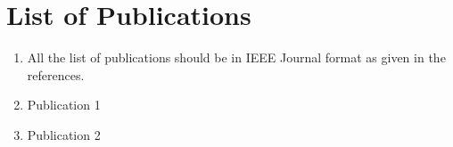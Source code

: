 \newpage
\normalsize{}

\chapter*{List of Publications}
\begin{enumerate}
	\item All the list of publications should be in IEEE Journal format as given in the references.
	\item Publication 1
	\item Publication 2
\end{enumerate}